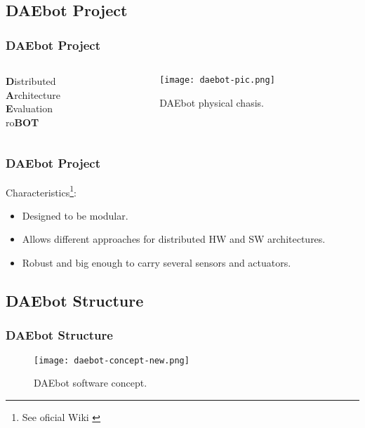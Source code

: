 
\subsection{DAEbot Project}

\begin{frame}
	\frametitle{DAEbot Project}
	\begin{columns}
		\begin{column}{0.4\textwidth}
			\begin{flushleft}
				\LARGE
				\textbf{D}istributed \\
				\textbf{A}rchitecture \\
				\textbf{E}valuation \\
				ro\textbf{BOT}
			\end{flushleft}
		\end{column} \pause
		\begin{column}{0.6\textwidth}
			\begin{figure}
				\texttt{[image: daebot-pic.png]}
				\caption{DAEbot physical chasis.}\label{fig:daebot-pic}
			\end{figure}
		\end{column}
	\end{columns}
\end{frame}

\begin{frame}
	\frametitle{DAEbot Project}
	Characteristics\footnote[frame]{See oficial Wiki \cite{Wiki}}: \pause
	\begin{itemize}
		\item Designed to be modular.
		\item Allows different approaches for distributed HW and SW architectures. \pause
		\item Robust and big enough to carry several sensors and actuators.
	\end{itemize}
\end{frame}

\subsection{DAEbot Structure}

\begin{frame}
	\frametitle{DAEbot Structure}
	\begin{figure}
		\texttt{[image: daebot-concept-new.png]}
		\caption{DAEbot software concept.}\label{fig:daebot-concept-new}
	\end{figure}
\end{frame}

